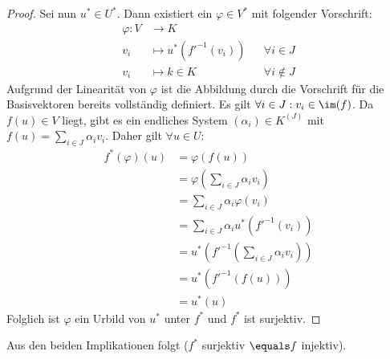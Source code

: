 \documentclass{article}
\begin{document}
\begin{enumerate}[(a)]
\begin{proof}
		Sei nun $u^*\in U^*$. Dann existiert ein $\varphi \in V^*$ mit folgender Vorschrift:
		\begin{align*}
			\varphi: V&\to K\\
			v_i &\mapsto u^*(f'^{-1}(v_i)) &&\forall i\in J\\
			v_i &\mapsto k \in K &&\forall i\notin J
		\end{align*}
		Aufgrund der Linearität von $\varphi$ ist die Abbildung durch die Vorschrift für die Basisvektoren bereits vollständig definiert. Es gilt $\forall i\in J: v_i\in\im(f)$. Da $f(u) \in V$ liegt, gibt es ein endliches System $(\alpha_i)\in K^{(J)}$ mit $f(u) = \sum_{i\in J} \alpha_i v_i$.
		Daher gilt $\forall u\in U:$
		\begin{align*}
			f^*(\varphi)(u) &= \varphi(f(u)) \\
			&= \varphi(\sum_{i\in J} \alpha_i v_i)\\
			&= \sum_{i\in J}\alpha_i \varphi(v_i)\\
			&= \sum_{i\in J}\alpha_i u^*(f'^{-1}(v_i)) \\
			&= u^*(f'^{-1}(\sum_{i\in J} \alpha_i v_i)) \\
			&= u^*(f'^{-1}(f(u))) \\
			&= u^*(u)
		\end{align*}
		Folglich ist $\varphi$ ein Urbild von $u^*$ unter $f^*$ und $f^*$ ist surjektiv.
	\end{proof}
	Aus den beiden Implikationen folgt ($f^*$ surjektiv $\equals f$ injektiv).
	\end{enumerate}
\end{document}
